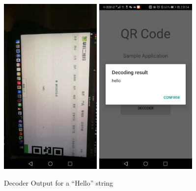 \begin{figure}[hb]
\begin{center}
\includegraphics[width=5cm]{img/decode1.jpeg}
\includegraphics[width=5cm]{img/decode2.jpeg}
\caption{Decoder Output for a ``Hello'' string}
\label{fig:decode}
\end{center}
\end{figure}